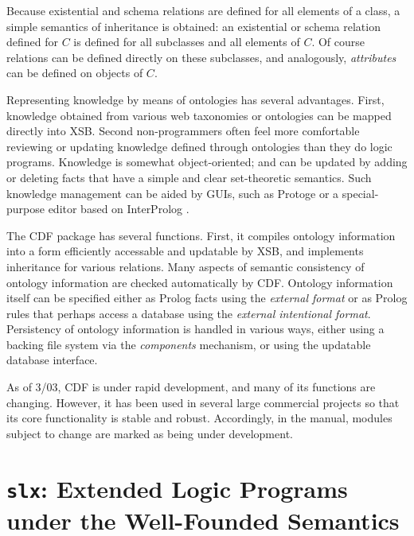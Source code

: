 {Because existential and schema relations are defined for all elements
of a class, a simple semantics of inheritance is obtained: an
existential or schema relation defined for $C$ is defined for all
subclasses and all elements of $C$.  Of course relations can be
defined directly on these subclasses, and analogously, {\em attributes}
can be defined on objects of $C$.

Representing knowledge by means of ontologies has several advantages.
First, knowledge obtained from various web taxonomies or ontologies
can be mapped directly into XSB.  Second non-programmers often feel
more comfortable reviewing or updating knowledge defined through
ontologies than they do logic programs.  Knowledge is somewhat
object-oriented; and can be updated by adding or deleting facts that
have a simple and clear set-theoretic semantics.  Such knowledge
management can be aided by GUIs, such as Protoge \cite{protege} or a
special-purpose editor based on InterProlog \cite{interprolog}.

The CDF package has several functions.  First, it compiles ontology
information into a form efficiently accessable and updatable by XSB,
and implements inheritance for various relations.  Many aspects of
semantic consistency of ontology information are checked automatically
by CDF.  Ontology information itself can be specified either as Prolog
facts using the {\em external format} or as Prolog rules that perhaps
access a database using the {\em external intentional format}.
Persistency of ontology information is handled in various ways, either
using a backing file system via the {\em components} mechanism, or
using the updatable database interface.

As of 3/03, CDF is under rapid development, and many of its functions
are changing.  However, it has been used in several large commercial
projects so that its core functionality is stable and robust.
Accordingly, in the manual, modules subject to change are marked as
being under development.
}

\section{{\tt slx}: Extended Logic Programs under the Well-Founded
Semantics}
\label{package:wfsx} 

